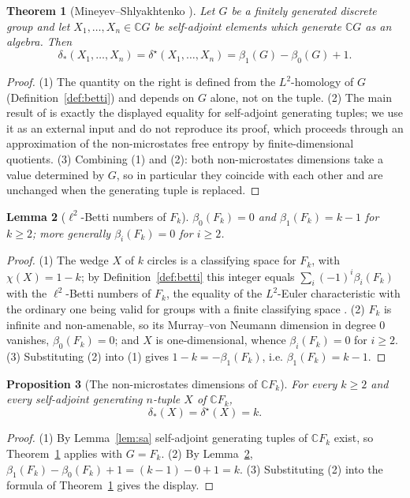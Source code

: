 \documentclass[11pt]{article}
\theoremstyle{plain}
\newtheorem{theorem}{Theorem}[section]
\newtheorem{lemma}[theorem]{Lemma}
\newtheorem{proposition}[theorem]{Proposition}
\theoremstyle{definition}
\theoremstyle{remark}
\newcommand{\C}{\mathbb{C}}\newcommand{\N}{\mathbb{N}}
\begin{document}
\begin{theorem}[Mineyev--Shlyakhtenko \cite{MS05}]\label{thm:ms}
Let $G$ be a finitely generated discrete group and let $X_1,\dots,X_n\in\C G$ be self-adjoint elements which generate $\C G$ as an algebra. Then
\[
\delta_*(X_1,\dots,X_n)=\delta^\star(X_1,\dots,X_n)=\beta_1(G)-\beta_0(G)+1 .
\]
\end{theorem}

\begin{proof}
(1) The quantity on the right is defined from the $L^2$-homology of $G$ (Definition~\ref{def:betti}) and depends on $G$ alone, not on the tuple.
(2) The main result of \cite{MS05} is exactly the displayed equality for self-adjoint generating tuples; we use it as an external input and do not reproduce its proof, which proceeds through an approximation of the non-microstates free entropy by finite-dimensional quotients.
(3) Combining (1) and (2): both non-microstates dimensions take a value determined by $G$, so in particular they coincide with each other and are unchanged when the generating tuple is replaced.
\end{proof}

\begin{lemma}[$\ell^2$-Betti numbers of $F_k$]\label{lem:betti}
$\beta_0(F_k)=0$ and $\beta_1(F_k)=k-1$ for $k\ge2$; more generally $\beta_i(F_k)=0$ for $i\ge2$.
\end{lemma}

\begin{proof}
(1) The wedge $X$ of $k$ circles is a classifying space for $F_k$, with $\chi(X)=1-k$; by Definition~\ref{def:betti} this integer equals $\sum_i(-1)^i\beta_i(F_k)$ with the $\ell^2$-Betti numbers of $F_k$, the equality of the $L^2$-Euler characteristic with the ordinary one being valid for groups with a finite classifying space \cite{At76}.
(2) $F_k$ is infinite and non-amenable, so its Murray--von Neumann dimension in degree $0$ vanishes, $\beta_0(F_k)=0$; and $X$ is one-dimensional, whence $\beta_i(F_k)=0$ for $i\ge2$.
(3) Substituting (2) into (1) gives $1-k=-\beta_1(F_k)$, i.e. $\beta_1(F_k)=k-1$.
\end{proof}

\begin{proposition}[The non-microstates dimensions of $\C F_k$]\label{prop:k}
For every $k\ge2$ and every self-adjoint generating $n$-tuple $X$ of $\C F_k$,
\[
\delta_*(X)=\delta^\star(X)=k .
\]
\end{proposition}

\begin{proof}
(1) By Lemma~\ref{lem:sa} self-adjoint generating tuples of $\C F_k$ exist, so Theorem~\ref{thm:ms} applies with $G=F_k$.
(2) By Lemma~\ref{lem:betti}, $\beta_1(F_k)-\beta_0(F_k)+1=(k-1)-0+1=k$.
(3) Substituting (2) into the formula of Theorem~\ref{thm:ms} gives the display.
\end{proof}
\end{document}
